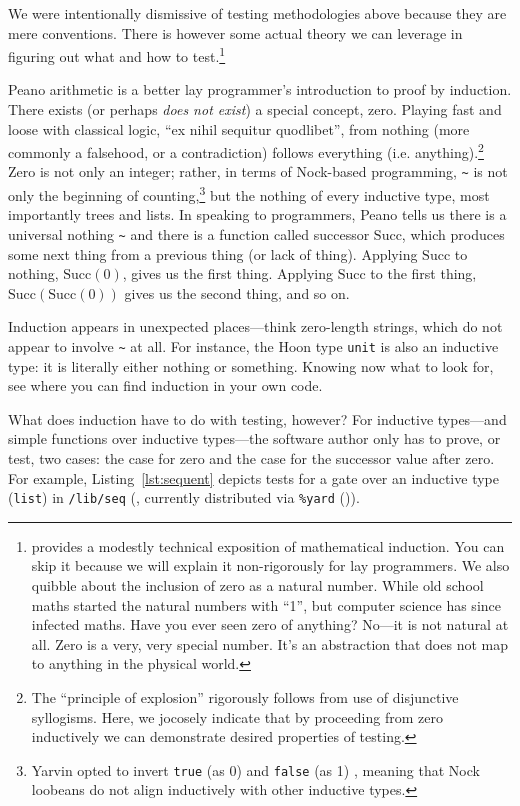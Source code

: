 \documentclass[twoside]{article}
\begin{document}
We were intentionally dismissive of testing methodologies a\-bove because they are mere conventions. There is however some actual theory we can leverage in figuring out what and how to test.\footnote{\citet{WikipediaInduction} provides a modestly technical exposition of mathematical induction. You can skip it because we will explain it non-rigorously for lay programmers. We also quibble about the inclusion of zero as a natural number. While old school maths started the natural numbers with “1”, but computer science has since infected maths. Have you ever seen zero of anything? No—it is not natural at all. Zero is a very, very special number. It's an abstraction that does not map to anything in the physical world.}

Peano arithmetic is a better lay programmer's introduction to proof by induction. There exists (or perhaps \emph{does not exist}) a special concept, zero. Playing fast and loose with classical logic, “ex nihil sequitur quodlibet”, from nothing (more commonly a falsehood, or a contradiction) follows everything (i.e. anything).\footnote{The “principle of explosion” rigorously follows from use of disjunctive syllogisms.  Here, we jocosely indicate that by proceeding from zero inductively we can demonstrate desired properties of testing.} Zero is not only an integer; rather, in terms of Nock-based programming, \lstinline[style=inlinecode]{~} is not only the beginning of counting,\footnote{Yarvin opted to invert \texttt{true} (as 0) and \texttt{false} (as 1) \citep{Yarvin2006}, meaning that Nock loobeans do not align inductively with other inductive types.} but the nothing of every inductive type, most importantly trees and lists. In speaking to programmers, Peano tells us there is a universal nothing \lstinline[style=inlinecode]{~} and there is a function called successor $\textrm{Succ}$, which produces some next thing from a previous thing (or lack of thing). Applying $\textrm{Succ}$ to nothing, $\textrm{Succ}(0)$, gives us the first thing.  Applying $\textrm{Succ}$ to the first thing, $\textrm{Succ}(\textrm{Succ}(0))$ gives us the second thing, and so on.

Induction appears in unexpected places—think zero-length strings, which do not appear to involve \lstinline[style=inlinecode]{~} at all. For instance, the Hoon type \texttt{unit} is also an inductive type: it is literally either nothing or something. Knowing now what to look for, see where you can find induction in your own code.

What does induction have to do with testing, however?  For inductive types—and simple functions over inductive types—the software author only has to prove, or test, two cases:  the case for zero and the case for the successor value after zero.  For example, Listing~\ref{lst:sequent} depicts tests for a gate over an inductive type (\texttt{list}) in \texttt{/lib/seq} (, currently distributed via \texttt{\%yard} ()).
\end{document}
